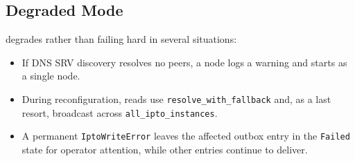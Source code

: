 \subsection{Degraded Mode}

\vannak{} degrades rather than failing hard in several situations:

\begin{itemize}
\item If DNS SRV discovery resolves no peers, a node logs a warning and starts
  as a single node.
\item During reconfiguration, reads use \texttt{resolve\_with\_fallback} and,
  as a last resort, broadcast across \texttt{all\_ipto\_instances}.
\item A permanent \texttt{IptoWriteError} leaves the affected outbox entry in
  the \texttt{Failed} state for operator attention, while other entries continue
  to deliver.
\end{itemize}

\endinput

